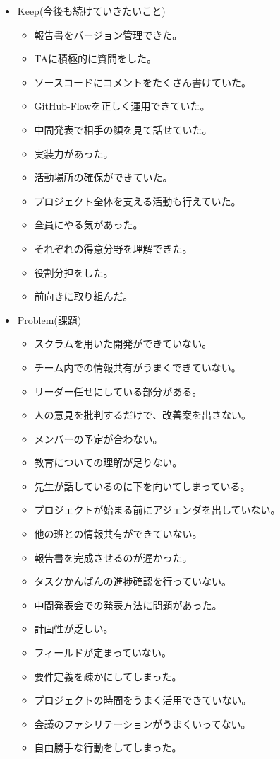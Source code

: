 \documentclass[openany,11pt,papersize]{jsbook}
\begin{document}
\begin{itemize}
\setlength{\itemsep}{5mm}

\item 
Keep(今後も続けていきたいこと)
\begin{itemize}
\item
報告書をバージョン管理できた。
\item
TAに積極的に質問をした。
\item
ソースコードにコメントをたくさん書けていた。
\item
GitHub-Flowを正しく運用できていた。
\item
中間発表で相手の顔を見て話せていた。
\item
実装力があった。
\item
活動場所の確保ができていた。
\item
プロジェクト全体を支える活動も行えていた。
\item
全員にやる気があった。
\item
それぞれの得意分野を理解できた。
\item
役割分担をした。
\item
前向きに取り組んだ。
\end{itemize}

\item 
Problem(課題)
\begin{itemize}
\item
スクラムを用いた開発ができていない。
\item
チーム内での情報共有がうまくできていない。
\item
リーダー任せにしている部分がある。
\item
人の意見を批判するだけで、改善案を出さない。
\item
メンバーの予定が合わない。
\item
教育についての理解が足りない。
\item
先生が話しているのに下を向いてしまっている。
\item
プロジェクトが始まる前にアジェンダを出していない。
\item
他の班との情報共有ができていない。
\item
報告書を完成させるのが遅かった。
\item
タスクかんばんの進捗確認を行っていない。
\item
中間発表会での発表方法に問題があった。
\item
計画性が乏しい。
\item
フィールドが定まっていない。
\item
要件定義を疎かにしてしまった。
\item
プロジェクトの時間をうまく活用できていない。
\item
会議のファシリテーションがうまくいってない。
\item
自由勝手な行動をしてしまった。
\end{itemize}


\end{itemize}
\end{document}
